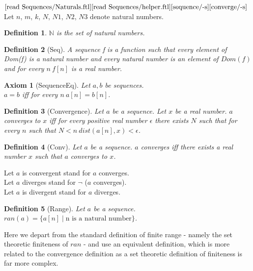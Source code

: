 \documentclass{article}
\newenvironment{forthel}{\begin{leftbar}}{\end{leftbar}}
\newtheorem{axiom}{Axiom}
\newtheorem{definition}{Definition}
\newcommand{\NN}{\mathbb{N}}
\begin{document}
\begin{forthel}
	\noindent $\text{[read Sequences/Naturals.ftl]}\\
	\text{[read Sequences/helper.ftl]}\\
	\text{[sequence/-s]}
	\text{[converge/-s]}$\\
	Let $n$, $m$, $k$, $N$, $N1$, $N2$, $N3$ denote natural numbers.

	\begin{definition}
		$\NN$ is the set of natural numbers.
	\end{definition}
	
	\begin{definition}[Seq]	A sequence f is a function such that every element of Dom(f) is a natural number and every
	natural number is an element of $Dom(f)$ and for every $n \ f[n]$ is a real number.
	\end{definition}
	
	\begin{axiom}[SequenceEq] Let $a, b$ be sequences. \\ $a = b$ iff for every $n \ a[n] = b[n]$.
	\end{axiom}
	
	\begin{definition}[Convergence] Let $a$ be a sequence. Let $x$ be a real number. $a$ converges to $x$ iff for every positive real
	number $\epsilon$ there exists $N$ such that for every $n$ such that $N < n \ dist(a[n],x) < \epsilon$.
	\end{definition}
	
	\begin{definition}[Conv] Let $a$ be a sequence. $a$ converges iff there exists a real number $x$ such that $a$ converges to $x$.
	\end{definition}
	
	\noindent Let $a$ is convergent stand for $a$ converges.
	\\Let $a$ diverges stand for $\neg$ ($a$ converges).
	\\Let $a$ is divergent stand for $a$ diverges.
	
	\begin{definition}[Range] Let $a$ be a sequence. \\ $ran(a) = \{a[n] \mid \text{n is a natural number} \}$. 
	\end{definition}
\end{forthel}

\noindent Here we depart from the standard definition of finite range - namely the set theoretic finiteness of $ran$ - and use an equivalent definition, which is more related to the convergence definition as a set theoretic definition of finiteness is far more complex.
\end{document}
